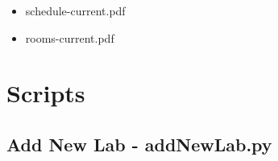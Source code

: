 \documentclass[justified]{book}
\begin{document}
\begin{itemize}
\item schedule-current.pdf
\item rooms-current.pdf
\end{itemize}


\section{Scripts}

\subsection{Add New Lab - addNewLab.py}







\end{document}
